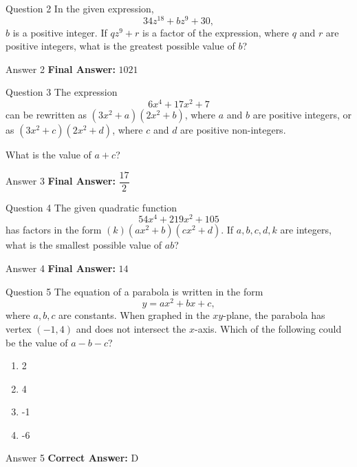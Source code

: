 \documentclass{beamer}
\begin{document}
\begin{frame}{Question 2}
\small
In the given expression,
\[
34z^{18} + b z^9 + 30,
\]
\(b\) is a positive integer. If \(qz^9 + r\) is a factor of the expression, where \(q\) and \(r\) are positive integers, what is the greatest possible value of \(b\)?
\end{frame}
\begin{frame}{Answer 2}
\small
\textbf{Final Answer:} $\boxed{1021}$
\end{frame}

\begin{frame}{Question 3}
\small
The expression
\[
6x^4 + 17x^2 + 7
\]
can be rewritten as \((3x^2 + a)(2x^2 + b)\), where \(a\) and \(b\) are positive integers, or as \((3x^2 + c)(2x^2 + d)\), where \(c\) and \(d\) are positive non-integers.

What is the value of \(a + c\)?
\end{frame}
\begin{frame}{Answer 3}
\small
\textbf{Final Answer:} $\boxed{\dfrac{17}{2}}$
\end{frame}

\begin{frame}{Question 4}
\small
The given quadratic function
\[
54x^4 + 219x^2 + 105
\]
has factors in the form \((k)(ax^2 + b)(cx^2 + d)\). If \(a, b, c, d, k\) are integers, what is the smallest possible value of \(ab\)?
\end{frame}
\begin{frame}{Answer 4}
\small
\textbf{Final Answer:} $\boxed{14}$
\end{frame}

\begin{frame}{Question 5}
\small
The equation of a parabola is written in the form
\[
y = ax^2 + bx + c,
\]
where \(a, b, c\) are constants. When graphed in the \(xy\)-plane, the parabola has vertex \((-1, 4)\) and does not intersect the \(x\)-axis. Which of the following could be the value of \(a - b - c\)?
\vspace{0.35cm}
\begin{enumerate}
    \item[A.] 2
    \item[B.] 4
    \item[C.] -1
    \item[D.] -6
\end{enumerate}
\end{frame}
\begin{frame}{Answer 5}
\small
\textbf{Correct Answer:} D
\end{frame}
\end{document}
